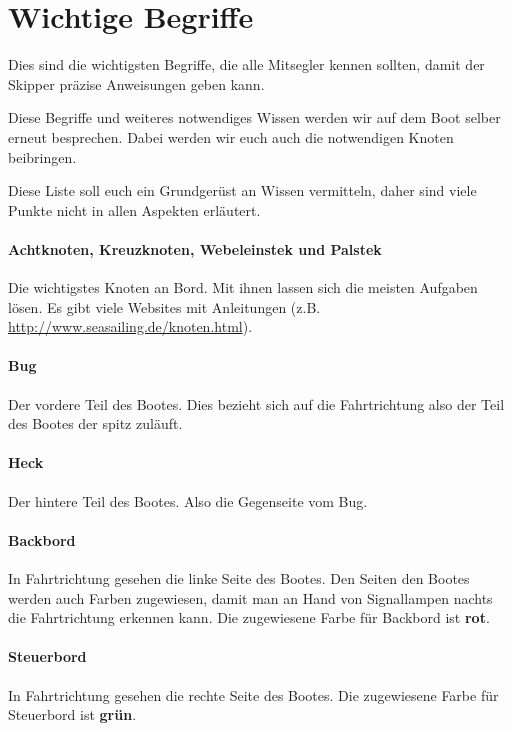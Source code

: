 \documentclass[12pt]{article}
\newcommand{\xbox}[1]{\vspace{1em}\fcolorbox{grey}{white}{\parbox{0.8\textwidth}{\textcolor{grey}{#1}}}}
\begin{document}
\section{Wichtige Begriffe}
Dies sind die wichtigsten Begriffe, die alle Mitsegler kennen sollten, damit der Skipper präzise Anweisungen geben kann.

Diese Begriffe und weiteres notwendiges Wissen werden wir auf dem Boot selber erneut besprechen. Dabei werden wir euch auch die notwendigen Knoten beibringen.

Diese Liste soll euch ein Grundgerüst an Wissen vermitteln, daher sind viele Punkte nicht in allen Aspekten erläutert.

\paragraph{Achtknoten, Kreuzknoten, Webeleinstek und Palstek}
Die wichtigstes Knoten an Bord. Mit ihnen lassen sich die meisten Aufgaben lösen.
Es gibt viele Websites mit Anleitungen (z.B. \href{http://www.seasailing.de/knoten.html}{http://www.seasailing.de/knoten.html}).

\paragraph{Bug}
Der vordere Teil des Bootes. Dies bezieht sich auf die Fahrtrichtung also der Teil des Bootes der spitz zuläuft.

\paragraph{Heck}
Der hintere Teil des Bootes. Also die Gegenseite vom Bug.

\paragraph{Backbord}
In Fahrtrichtung gesehen die linke Seite des Bootes. Den Seiten den Bootes werden auch Farben zugewiesen, damit man an Hand von Signallampen nachts die Fahrtrichtung erkennen kann. Die zugewiesene Farbe für Backbord ist \textbf{rot}.

\paragraph{Steuerbord}
In Fahrtrichtung gesehen die rechte Seite des Bootes. Die zugewiesene Farbe für Steuerbord ist \textbf{grün}.

\xbox{Vergisst die Crew Backbord und Steuerbord gibt es vom Skipper - ein Rechtshänder - eine Backpfeife. Nun färbt sich die linke Backe rot. }
\end{document}
